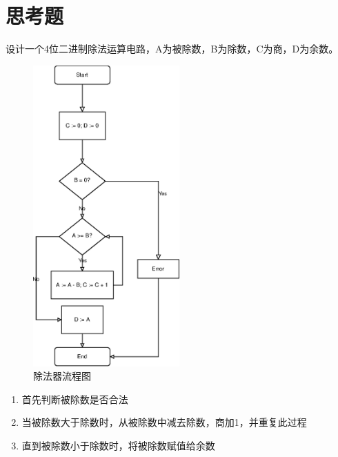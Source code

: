 \documentclass[a4paper]{article}
\begin{document}
\section{思考题}

设计一个4位二进制除法运算电路，A为被除数，B为除数，C为商，D为余数。

\begin{figure}[H]
    \centering
    \includegraphics[width=0.5\textwidth]{./assets/flow.eps}
    \caption{除法器流程图}
\end{figure}

\begin{enumerate}
    \item 首先判断被除数是否合法
    \item 当被除数大于除数时，从被除数中减去除数，商加1，并重复此过程
    \item 直到被除数小于除数时，将被除数赋值给余数
\end{enumerate}
\end{document}
